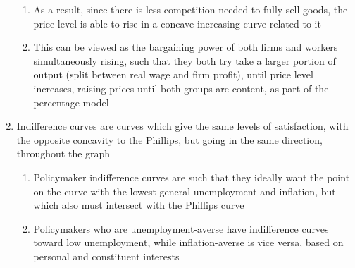 \begin{enumerate}
\begin{enumerate}
\item As a result, since there is less competition needed to fully sell goods, the price level is able to rise in a concave increasing curve related to it
\item This can be viewed as the bargaining power of both firms and workers simultaneously rising, such that they both try take a larger portion of output (split between real wage and firm profit), until price level increases, raising prices until both groups are content, as part of the percentage model
\end{enumerate}
\item Indifference curves are curves which give the same levels of satisfaction, with the opposite concavity to the Phillips, but going in the same direction, throughout the graph
\begin{enumerate}
\item Policymaker indifference curves are such that they ideally want the point on the curve with the lowest general unemployment and inflation, but which also must intersect with the Phillips curve
\item Policymakers who are unemployment-averse have indifference curves toward low unemployment, while inflation-averse is vice versa, based on personal and constituent interests
\end{enumerate}
\end{enumerate}

